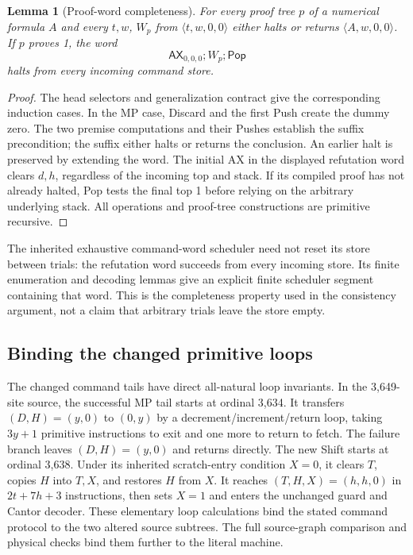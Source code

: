 \documentclass[11pt]{article}
\newtheorem{lemma}[theorem]{Lemma}
\newcommand{\AX}{\mathsf{AX}}
\begin{document}
\begin{lemma}[Proof-word completeness]
For every proof tree $p$ of a numerical formula $A$ and every $t,w$,
$W_p$ from $\langle t,w,0,0\rangle$ either halts or returns
$\langle A,w,0,0\rangle$. If $p$ proves 1, the word
\[
\AX_{0,0,0};W_p;\mathsf{Pop}
\]
halts from every incoming command store.
\end{lemma}
\begin{proof}
The head selectors and generalization contract give the corresponding
induction cases. In the MP case, Discard and the first Push create the
dummy zero. The two premise computations and their Pushes establish the
suffix precondition; the suffix either halts or returns the conclusion.
An earlier halt is preserved by extending the word. The initial AX in
the displayed refutation word clears $d,h$, regardless of the incoming
top and stack. If its compiled proof has not already halted, Pop tests
the final top 1 before relying on the arbitrary underlying stack.
All operations and proof-tree constructions are primitive recursive.
\end{proof}

The inherited exhaustive command-word scheduler need not reset its store
between trials: the refutation word succeeds from every incoming store.
Its finite enumeration and decoding lemmas give an explicit finite
scheduler segment containing that word. This is the completeness
property used in the consistency argument, not a claim that arbitrary
trials leave the store empty.

\subsection{Binding the changed primitive loops}

The changed command tails have direct all-natural loop invariants. In
the 3,649-site source, the successful MP tail starts at ordinal 3,634.
It transfers $(D,H)=(y,0)$ to $(0,y)$ by a decrement/increment/return
loop, taking $3y+1$ primitive instructions to exit and one more to return
to fetch. The failure branch leaves $(D,H)=(y,0)$ and returns directly.
The new Shift starts at ordinal 3,638. Under its inherited scratch-entry
condition $X=0$, it clears $T$, copies $H$ into $T,X$, and restores $H$
from $X$. It reaches $(T,H,X)=(h,h,0)$ in $2t+7h+3$ instructions, then
sets $X=1$ and enters the unchanged guard and Cantor decoder. These
elementary loop calculations bind the stated command protocol to the
two altered source subtrees. The full source-graph comparison and
physical checks bind them further to the literal machine.
\end{document}
